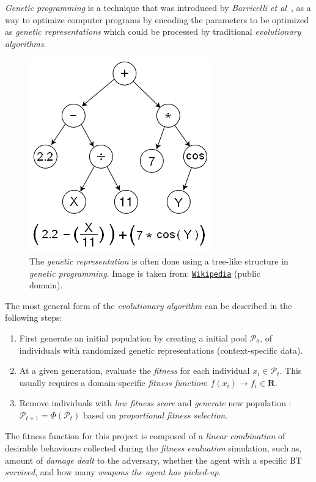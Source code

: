 \documentclass[a4paper, twocolumn]{article}
\begin{document}
	\emph{Genetic programming} is a technique that was introduced by \emph{Barricelli et al}~\cite{barricelli1954esempi}, as a way to optimize computer programs by encoding the parameters to be optimized as \emph{genetic representations} which could be processed by traditional \emph{evolutionary algorithms}.

	\begin{figure}[H]
        \centering
		\includegraphics[width=0.5\linewidth]{share/Genetic_Program_Tree.png}
        \caption{The \emph{genetic representation} is often done using a tree-like structure in \emph{genetic programming}. Image is taken from: \texttt{\href{https://upload.wikimedia.org/wikipedia/commons/7/77/Genetic\_Program\_Tree.png}{Wikipedia}} (public domain).}
		\label{fig:genetic_representation}
	\end{figure}

	The most general form of the \emph{evolutionary algorithm} can be described in the following steps:
    \begin{enumerate}
        \item First generate an initial population by creating a initial pool \(\mathcal{P}_0\), of individuals with randomized genetic representations (context-specific data).
        \item At a given generation, evaluate the \emph{fitness} for each individual \(x_i \in \mathcal{P}_t\). This usually requires a domain-specific \emph{fitness function}: \(f(x_i)\rightarrow f_i \in \mathbf{R}\).
        \item Remove individuals with \textit{low fitness score} and \emph{generate} new population : \(\mathcal{P}_{t+1} = \Phi(\mathcal{P}_t)\) based on \emph{proportional fitness selection}.
    \end{enumerate}

    The fitness function for this project is composed of a \emph{linear combination} of desirable behaviours collected during the \emph{fitness evaluation} simulation, such as, amount of \emph{damage dealt} to the adversary, whether the agent with a specific BT \emph{survived}, and how many \emph{weapons the agent has picked-up}. 
\end{document}
